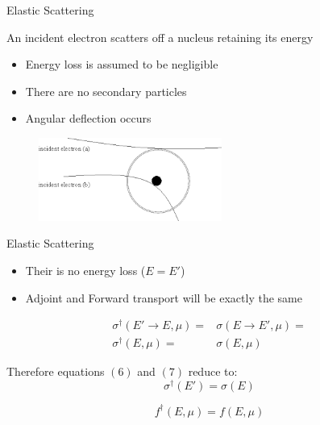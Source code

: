\documentclass{beamer}
\begin{document}
  \begin{frame}{Elastic Scattering}

  \begin{block}{An incident electron scatters off a nucleus retaining its energy}
    \begin{itemize}
      \item Energy loss is assumed to be negligible
      \item There are no secondary particles
      \item Angular deflection occurs
    \end{itemize}
  \end{block}
  
      \begin{figure}
     \includegraphics[width=60mm]{elastic2.png}
   \end{figure}

\end{frame}

\begin{frame}{Elastic Scattering}
	\begin{itemize}
	\item Their is no energy loss ($ E = E'$)
	\item Adjoint and Forward transport will be exactly the same
	\end{itemize}
\begin{align}
\sigma^{\dagger}(E' \rightarrow E, \mu) = &\sigma(E \rightarrow E', \mu) = \nonumber \\
\sigma^{\dagger}(E, \mu) = &\sigma(E, \mu)
\end{align}

Therefore equations $(6)$ and $(7)$ reduce to:
\begin{equation}
\sigma^{\dagger}(E') = \sigma(E)
\end{equation}

\begin{equation}
f^{\dagger}(E, \mu) = f(E, \mu)
\end{equation}

\end{frame}

  
\end{document}
